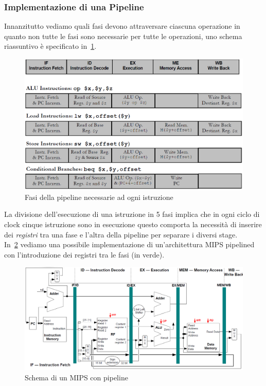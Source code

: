 \subsubsection{Implementazione di una Pipeline}
Innanzitutto vediamo quali fasi devono attraversare ciascuna operazione in quanto non tutte le fasi sono necessarie per tutte le operazioni, uno schema riassuntivo è specificato in \figurename\,\ref{fig:pipefasi}.\\
\begin{figure}[tbh]
\centering
\includegraphics[scale=0.4]{img/pipefasi.png}
\caption{Fasi della pipeline necessarie ad ogni istruzione}\label{fig:pipefasi}
\end{figure}
La divisione dell'esecuzione di una istruzione in 5 fasi implica che in ogni ciclo di clock cinque istruzione sono in esecuzione questo comporta la necessità di inserire dei \emph{registri} tra una fase e l'altra della pipeline per separare i diversi stage.\\
In \figurename\,\ref{fig:pipeline} vediamo una possibile implementazione di un'architettura MIPS pipelined con l'introduzione dei registri tra le fasi (in verde).
\begin{figure}[!Hptb]
\centering
\includegraphics[scale=0.6, angle=90]{img/pipeline.png}
\caption{Schema di un MIPS con pipeline}\label{fig:pipeline}
\end{figure}
\pagebreak
